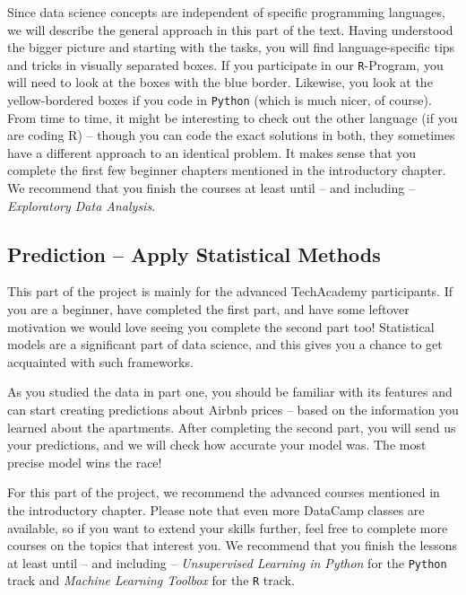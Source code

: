 \documentclass[
  11pt,
]{article}
\begin{document}
Since data science concepts are independent of specific programming languages, we will describe the general approach in this part of the text. Having understood the bigger picture and starting with the tasks, you will find language-specific tips and tricks in visually separated boxes. If you participate in our \texttt{R}-Program, you will need to look at the boxes with the blue border. Likewise, you look at the yellow-bordered boxes if you code in \texttt{Python} (which is much nicer, of course). From time to time, it might be interesting to check out the other language (if you are coding R) -- though you can code the exact solutions in both, they sometimes have a different approach to an identical problem. It makes sense that you complete the first few beginner chapters mentioned in the introductory chapter. We recommend that you finish the courses at least until -- and including -- \emph{Exploratory Data Analysis}.

\hypertarget{prediction-apply-statistical-methods}{%
\subsection{Prediction -- Apply Statistical Methods}\label{prediction-apply-statistical-methods}}

This part of the project is mainly for the advanced TechAcademy participants. If you are a beginner, have completed the first part, and have some leftover motivation we would love seeing you complete the second part too!
Statistical models are a significant part of data science, and this gives you a chance to get acquainted with such frameworks.

As you studied the data in part one, you should be familiar with its features and can start creating predictions about Airbnb prices -- based on the information you learned about the apartments. After completing the second part, you will send us your predictions, and we will check how accurate your model was. The most precise model wins the race!

For this part of the project, we recommend the advanced courses mentioned in the introductory chapter. Please note that even more DataCamp classes are available, so if you want to extend your skills further, feel free to complete more courses on the topics that interest you. We recommend that you finish the lessons at least until -- and including -- \emph{Unsupervised Learning in Python} for the \texttt{Python} track and \emph{Machine Learning Toolbox} for the \texttt{R} track.
\end{document}
